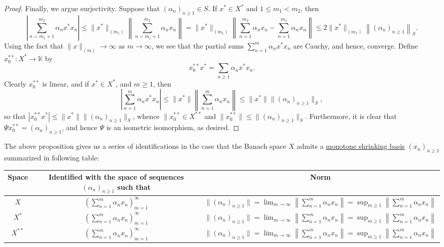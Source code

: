 \documentclass[11pt]{article}
\theoremstyle{thmstyle}
\theoremstyle{defstyle}
\newcommand{\R}{\mathbb{R}}
\newcommand{\bbC}{\mathbb{C}}
\newcommand{\K}{\mathbb{K}} %
\renewcommand{\le}{\leqslant}
\renewcommand{\ge}{\geqslant}
\begin{document}
\begin{proof}
	Finally, we argue surjectivity. Suppose that $(\alpha_n)_{n\ge 1}\in S$. If $x^{\ast}\in X^\ast$ and $1\le m_1 < m_2$, then 
	\begin{equation*}
		\left|\sum_{n = m_1 + 1}^{m_2}\alpha_n x^\ast x_n\right|\le \|x^\ast\|_{(m_1)}\left\|\sum_{n = m_1 + 1}^{m_2} \alpha_n x_n\right\| = \|x^\ast\|_{(m_1)}\left\|\sum_{n = 1}^{m_2} \alpha_n x_n - \sum_{n = 1}^{m_1} \alpha_n x_n\right\|\le 2\|x^\ast\|_{(m_1)}\left\|(\alpha_n)_{n\ge 1}\right\|_S.
	\end{equation*}
	Using the fact that $\|x\|_{(m)}\to\infty$ as $m\to\infty$, we see that the partial sums $\displaystyle\sum_{n = 1}^m\alpha_n x^\ast x_n$ are Cauchy, and hence, converge. Define $x_0^{\ast\ast}\colon X^\ast\to\K$ by 
	\begin{equation*}
		x_0^{\ast\ast}x^\ast = \sum_{n\ge 1} \alpha_n x^\ast x_n.
	\end{equation*}
	Clearly $x_0^{\ast\ast}$ is linear, and if $x^\ast\in X^\ast$, and $m\ge 1$, then 
	\begin{equation*}
		\left|\sum_{n = 1}^m \alpha_n x^\ast x_n\right|\le \|x^\ast\|\left\|\sum_{n = 1}^m\alpha_n x_n\right\|\le \|x^\ast\|\|(\alpha_n)_{n\ge 1}\|_S,
	\end{equation*}
	so that $|x_0^{\ast\ast} x^\ast|\le \|x^\ast\|\|(\alpha_n)_{n\ge 1}\|_S$, whence $\|x_0^{\ast\ast}\in X^{\ast\ast}$ and $\|x_0^{\ast\ast}\|\le \|(\alpha_n)_{n\ge 1}\|_S$. Furthermore, it is clear that $\Psi x_0^{\ast\ast} = (\alpha_n)_{n\ge 1}$, and hence $\Psi$ is an isometric isomorphism, as desired.
\end{proof}

The above proposition gives us a series of identifications in the case that the Banach space $X$ admits a \underline{monotone shrinking basis} $(x_n)_{n\ge 1}$ summarized in following table: 

\renewcommand{\arraystretch}{3}
\begin{center}
\begin{tabular}{|c|c|c|}
	\hline
	Space & \shortstack{Identified with the space \\of sequences $(\alpha_n)_{n\ge 1}$ such that} &  Norm\\
	\hline 
	$X$ & $\left(\displaystyle\sum_{n = 1}^{m}\alpha_n x_n\right)_{m = 1}^\infty$ & $\displaystyle\|(\alpha_n)_{n\ge 1}\| = \lim_{m\to\infty}\left\|\sum_{n = 1}^m \alpha_n x_n\right\| = \sup_{m\ge 1}\left\|\sum_{n = 1}^m \alpha_n x_n\right\|$\\
	\hline
	$X^\ast$ & $\left(\displaystyle\sum_{n = 1}^{m}\alpha_n x_n\right)_{m = 1}^\infty$ & $\displaystyle\|(\alpha_n)_{n\ge 1}\| = \lim_{m\to\infty}\left\|\sum_{n = 1}^m \alpha_n x_n\right\| = \sup_{m\ge 1}\left\|\sum_{n = 1}^m \alpha_n x_n\right\|$\\
	\hline 
	$X^{\ast\ast}$ & $\left(\displaystyle\sum_{n = 1}^{m}\alpha_n x_n\right)_{m = 1}^\infty$ & $\displaystyle\|(\alpha_n)_{n\ge 1}\| = \lim_{m\to\infty}\left\|\sum_{n = 1}^m \alpha_n x_n\right\| = \sup_{m\ge 1}\left\|\sum_{n = 1}^m \alpha_n x_n\right\|$\\
	\hline 
\end{tabular}
\end{center}
\end{document}
